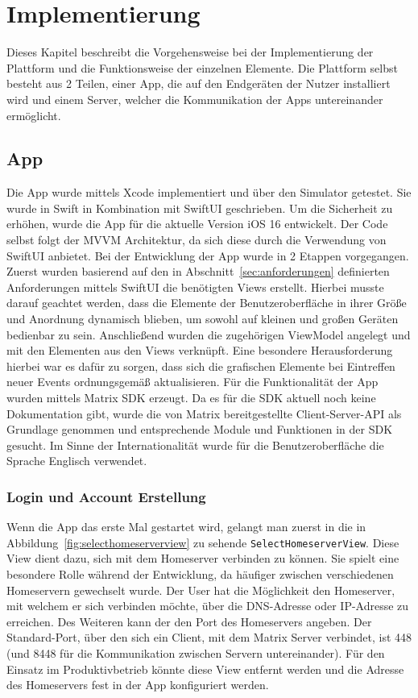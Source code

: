     \newpage
    \chapter{Implementierung}\label{ch:implementierung}
    Dieses Kapitel beschreibt die Vorgehensweise bei der Implementierung der Plattform und die Funktionsweise der einzelnen Elemente.
    Die Plattform selbst besteht aus 2 Teilen, einer App, die auf den Endgeräten der Nutzer installiert wird und einem Server, welcher die Kommunikation der Apps untereinander ermöglicht.


    \section{App}\label{sec:app}
    Die App wurde mittels Xcode implementiert und über den Simulator getestet.
    Sie wurde in Swift in Kombination mit SwiftUI geschrieben.
    Um die Sicherheit zu erhöhen, wurde die App für die aktuelle Version iOS 16 entwickelt.
    Der Code selbst folgt der MVVM Architektur, da sich diese durch die Verwendung von SwiftUI anbietet.
    Bei der Entwicklung der App wurde in 2 Etappen vorgegangen.
    Zuerst wurden basierend auf den in Abschnitt~\ref{sec:anforderungen} definierten Anforderungen mittels SwiftUI die benötigten Views erstellt.
    Hierbei musste darauf geachtet werden, dass die Elemente der Benutzeroberfläche in ihrer Größe und Anordnung dynamisch blieben, um sowohl auf kleinen und großen Geräten bedienbar zu sein.
    Anschließend wurden die zugehörigen ViewModel angelegt und mit den Elementen aus den Views verknüpft.
    Eine besondere Herausforderung hierbei war es dafür zu sorgen, dass sich die grafischen Elemente bei Eintreffen neuer Events ordnungsgemäß aktualisieren.
    Für die Funktionalität der App wurden mittels Matrix SDK erzeugt.
    Da es für die SDK aktuell noch keine Dokumentation gibt, wurde die von Matrix bereitgestellte Client-Server-API als Grundlage genommen und entsprechende Module und Funktionen in der SDK gesucht.
    Im Sinne der Internationalität wurde für die Benutzeroberfläche die Sprache Englisch verwendet.

    \newpage
    \subsection{Login und Account Erstellung}\label{subsec:login-und-account-erstellung}

    Wenn die App das erste Mal gestartet wird, gelangt man zuerst in die in Abbildung~\ref{fig:selecthomeserverview} zu sehende \texttt{SelectHomeserverView}.
    Diese View dient dazu, sich mit dem Homeserver verbinden zu können.
    Sie spielt eine besondere Rolle während der Entwicklung, da häufiger zwischen verschiedenen Homeservern gewechselt wurde.
    Der User hat die Möglichkeit den Homeserver, mit welchem er sich verbinden möchte, über die DNS-Adresse oder IP-Adresse zu erreichen.
    Des Weiteren kann der den Port des Homeservers angeben.
    Der Standard-Port, über den sich ein Client, mit dem Matrix Server verbindet, ist 448 (und 8448 für die Kommunikation zwischen Servern untereinander).
    Für den Einsatz im Produktivbetrieb könnte diese View entfernt werden und die Adresse des Homeservers fest in der App konfiguriert werden.

